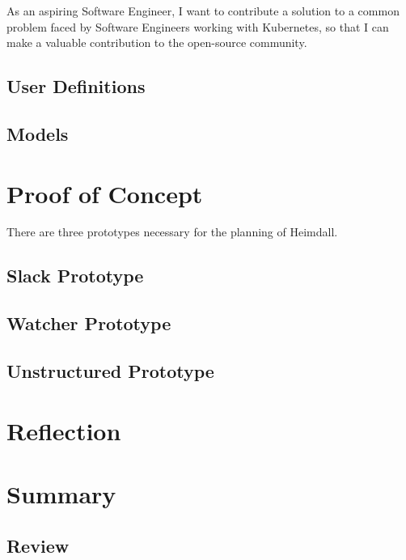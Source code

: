 \documentclass{article}
\begin{document}
As an aspiring Software Engineer, I want to contribute a solution to a common problem faced by Software Engineers working with Kubernetes, so that I can make a valuable contribution to the open-source community.



\subsection{User Definitions}



\subsection{Models}



\section{Proof of Concept}
There are three prototypes necessary for the planning of Heimdall. 

\subsection{Slack Prototype} \label{slack-poc}

\subsection{Watcher Prototype} \label{watcher-poc}

\subsection{Unstructured Prototype} \label{unstructured-poc}

\section{Reflection}



\section{Summary}



\subsection{Review}
\end{document}

